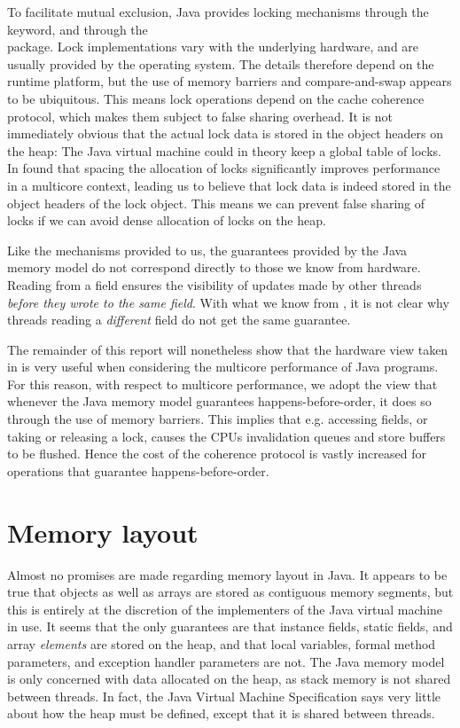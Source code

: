 To facilitate mutual exclusion, Java provides locking mechanisms through the
 keyword, and through the \\
package. Lock implementations vary with the underlying hardware, and are usually
provided by the operating system. The details therefore depend on the runtime
platform, but the use of memory barriers and compare-and-swap appears to be
ubiquitous. This means lock operations depend on the cache coherence protocol,
which makes them subject to false sharing overhead. It is not immediately
obvious that the actual lock data is stored in the object headers on the heap:
The Java virtual machine could in theory keep a global table of locks. In
\cite{mystery} \citeauthor{mystery} found that spacing the allocation of locks
significantly improves performance in a multicore context, leading us to believe
that lock data is indeed stored in the object headers of the lock object. This
means we can prevent false sharing of locks if we can avoid dense allocation of
locks on the heap.

Like the mechanisms provided to us, the guarantees provided by the Java memory
model do not correspond directly to those we know from hardware. Reading
from a  field ensures the visibility of updates made by other
threads \textit{before they wrote to the same field}. With what we know from
\cite{mckenny-barriers}, it is not clear why threads reading a
\textit{different}
 field do not get the same guarantee.

The remainder of this report will nonetheless show that the hardware view taken
in \cite{mckenny-barriers} is very useful when considering the multicore
performance of Java programs. For this reason, with respect to multicore performance, we adopt
the view that whenever the Java memory model guarantees happens-before-order, it
does so through the use of memory barriers. This implies that e.g. accessing
 fields, or taking or releasing a lock, causes the CPUs
invalidation queues and store buffers to be flushed. Hence the cost of the
coherence protocol is vastly increased for operations that guarantee
happens-before-order.

\section{Memory layout} Almost no promises are made regarding memory layout in
Java. It appears to be true that objects as well as arrays are stored as
contiguous memory segments,
but this is entirely at the discretion of the implementers of the Java virtual
machine in use. It seems that the only guarantees are that instance
fields, static fields, and array \textit{elements} are stored on the heap, and
that local variables, formal method parameters, and exception handler parameters
are not\cite[chapter~17]{javaspec}\cite[chapter~2]{jvmspec}. The Java memory
model is only concerned with data allocated on the heap, as stack memory is not
shared between threads. In fact, the Java Virtual Machine
Specification\cite{jvmspec} says very little about how the heap must be defined,
except that it is shared between threads.

